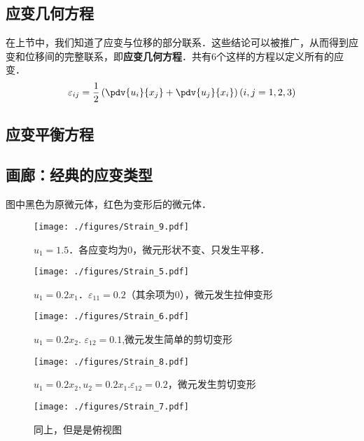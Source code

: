 \subsection{应变几何方程}
在上节中，我们知道了应变与位移的部分联系．这些结论可以被推广，从而得到应变和位移间的完整联系，即\textbf{应变几何方程}．共有6个这样的方程以定义所有的应变．
\begin{equation}
\varepsilon_{ij} = \frac{1}{2}\left(\pdv{u_i}{x_j}+\pdv{u_j}{x_i}\right) (i,j=1,2,3)
\end{equation}

\subsection{应变平衡方程}

\subsection{画廊：经典的应变类型}
图中黑色为原微元体，红色为变形后的微元体．
\begin{figure}[ht]
\centering
\texttt{[image: ./figures/Strain\_9.pdf]}
\caption{$u_1=1.5$．各应变均为$0$，微元形状不变、只发生平移．} \label{Strain_fig9}
\end{figure}

\begin{figure}[ht]
\centering
\texttt{[image: ./figures/Strain\_5.pdf]}
\caption{$u_1=0.2x_1$．$\varepsilon_{11}=0.2$（其余项为$0$），微元发生拉伸变形} \label{Strain_fig5}
\end{figure}

\begin{figure}[ht]
\centering
\texttt{[image: ./figures/Strain\_6.pdf]}
\caption{$u_1=0.2x_2$. $\varepsilon_{12}=0.1$,微元发生简单的剪切变形} \label{Strain_fig6}
\end{figure}

\begin{figure}[ht]
\centering
\texttt{[image: ./figures/Strain\_8.pdf]}
\caption{$u_1=0.2x_2, u_2=0.2x_1$.$\varepsilon_{12}=0.2$，微元发生剪切变形} \label{Strain_fig8}
\end{figure}
\begin{figure}[ht]
\centering
\texttt{[image: ./figures/Strain\_7.pdf]}
\caption{同上，但是是俯视图} \label{Strain_fig7}
\end{figure}

